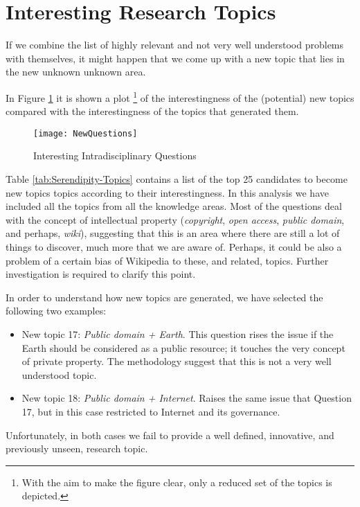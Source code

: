 %
%

\section{Interesting Research Topics}

If we combine the list of highly relevant and not very well understood
problems with themselves, it might happen that we come up with a new
topic that lies in the new unknown unknown area.

In Figure \ref{fig:Interesting-Intradisciplinary-Qu} it is shown
a plot%
\footnote{With the aim to make the figure clear, only a reduced set of the topics
is depicted.%
} of the interestingness of the (potential) new topics compared with
the interestingness of the topics that generated them.

\begin{figure}[h]
\centering\texttt{[image: NewQuestions]}
\caption{\label{fig:Interesting-Intradisciplinary-Qu}Interesting Intradisciplinary
Questions}
\end{figure}

Table \ref{tab:Serendipity-Topics} contains a list of the top 25
candidates to become new topics topics according to their interestingness.
In this analysis we have included all the topics from all the knowledge
areas. Most of the questions deal with the concept of intellectual
property (\emph{copyright}, \emph{open access}, \emph{public domain},
and perhaps, \emph{wiki}), suggesting that this is an area where there
are still a lot of things to discover, much more that we are aware
of. Perhaps, it could be also a problem of a certain bias of Wikipedia
to these, and related, topics. Further investigation is required to
clarify this point.

In order to understand how new topics are generated, we have selected
the following two examples:
\begin{itemize}
\item New topic 17: \emph{Public domain + Earth}. This question rises the
issue if the Earth should be considered as a public resource; it touches
the very concept of private property. The methodology suggest that
this is not a very well understood topic.
\item New topic 18: \emph{Public domain + Internet}. Raises the same issue
that Question 17, but in this case restricted to Internet and its
governance.
\end{itemize}
Unfortunately, in both cases we fail to provide a well defined, innovative,
and previously unseen, research topic.

